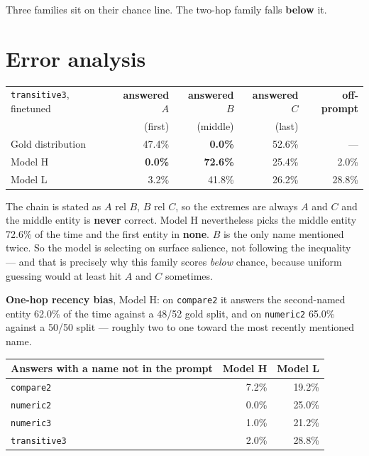 \documentclass[11pt]{report}
\begin{document}
Three families sit on their chance line. The two-hop family falls
\textbf{below} it.

\section{Error analysis}

\begin{center}\small
\begin{tabular}{lrrrr}
\toprule
\texttt{transitive3}, finetuned & \textbf{answered $A$} & \textbf{answered $B$} & \textbf{answered $C$} & \textbf{off-prompt} \\
& (first) & (middle) & (last) & \\
\midrule
Gold distribution & 47.4\% & \textbf{0.0\%} & 52.6\% & --- \\
Model H & \textbf{0.0\%} & \textbf{72.6\%} & 25.4\% & 2.0\% \\
Model L & 3.2\% & 41.8\% & 26.2\% & 28.8\% \\
\bottomrule
\end{tabular}
\end{center}

\begin{sayit}
The chain is stated as $A$ rel $B$, $B$ rel $C$, so the extremes are always $A$
and $C$ and the middle entity is \textbf{never} correct. Model H nevertheless
picks the middle entity 72.6\% of the time and the first entity in
\textbf{none}. $B$ is the only name mentioned twice. So the model is selecting
on surface salience, not following the inequality --- and that is precisely why
this family scores \emph{below} chance, because uniform guessing would at least
hit $A$ and $C$ sometimes.
\end{sayit}

\textbf{One-hop recency bias}, Model H: on \texttt{compare2} it answers the
second-named entity 62.0\% of the time against a 48/52 gold split, and on
\texttt{numeric2} 65.0\% against a 50/50 split --- roughly two to one toward the
most recently mentioned name.

\begin{center}\small
\begin{tabular}{lrr}
\toprule
\textbf{Answers with a name not in the prompt} & \textbf{Model H} & \textbf{Model L} \\
\midrule
\texttt{compare2} & 7.2\% & 19.2\% \\
\texttt{numeric2} & 0.0\% & 25.0\% \\
\texttt{numeric3} & 1.0\% & 21.2\% \\
\texttt{transitive3} & 2.0\% & 28.8\% \\
\bottomrule
\end{tabular}
\end{center}
\end{document}
